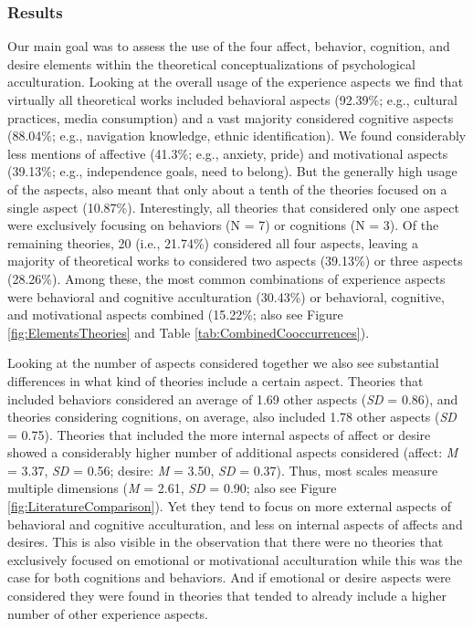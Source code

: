 \subsubsection{Results}

Our main goal was to assess the use of the four affect, behavior,
cognition, and desire elements within the theoretical conceptualizations
of psychological acculturation. Looking at the overall usage of the
experience aspects we find that virtually all theoretical works included
behavioral aspects (92.39\%; e.g., cultural practices, media
consumption) and a vast majority considered cognitive aspects (88.04\%;
e.g., navigation knowledge, ethnic identification). We found
considerably less mentions of affective (41.3\%; e.g., anxiety, pride)
and motivational aspects (39.13\%; e.g., independence goals, need to
belong). But the generally high usage of the aspects, also meant that
only about a tenth of the theories focused on a single aspect (10.87\%).
Interestingly, all theories that considered only one aspect were
exclusively focusing on behaviors (N = 7) or cognitions (N = 3). Of the
remaining theories, 20 (i.e., 21.74\%) considered all four aspects,
leaving a majority of theoretical works to considered two aspects
(39.13\%) or three aspects (28.26\%). Among these, the most common
combinations of experience aspects were behavioral and cognitive
acculturation (30.43\%) or behavioral, cognitive, and motivational
aspects combined (15.22\%; also see Figure \ref{fig:ElementsTheories}
and Table \ref{tab:CombinedCooccurrences}).

Looking at the number of aspects considered together we also see
substantial differences in what kind of theories include a certain
aspect. Theories that included behaviors considered an average of 1.69
other aspects (\textit{SD} = 0.86), and theories considering cognitions,
on average, also included 1.78 other aspects (\textit{SD} = 0.75).
Theories that included the more internal aspects of affect or desire
showed a considerably higher number of additional aspects considered
(affect: \textit{M} = 3.37, \textit{SD} = 0.56; desire: \textit{M} =
3.50, \textit{SD} = 0.37). Thus, most scales measure multiple dimensions
(\textit{M} = 2.61, \textit{SD} = 0.90; also see Figure
\ref{fig:LiteratureComparison}). Yet they tend to focus on more external
aspects of behavioral and cognitive acculturation, and less on internal
aspects of affects and desires. This is also visible in the observation
that there were no theories that exclusively focused on emotional or
motivational acculturation while this was the case for both cognitions
and behaviors. And if emotional or desire aspects were considered they
were found in theories that tended to already include a higher number of
other experience aspects.


